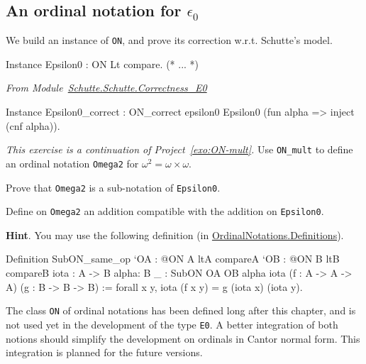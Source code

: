 \subsection{An ordinal notation for  \texorpdfstring{$\epsilon_0$}{epsilon0}}

We build an instance of \texttt{ON}, and prove its correction w.r.t. Schutte's model.

\label{instance-epsilon0}
\begin{Coqsrc}
Instance Epsilon0 : ON Lt compare.  
(* ... *)
\end{Coqsrc}


\emph{From Module~\href{../theories/html/hydras.Schutte.Schutte.Correctness_E0.html}{Schutte.Schutte.Correctness\_E0}}

\begin{Coqsrc}
Instance Epsilon0_correct :
  ON_correct epsilon0 Epsilon0 (fun alpha => inject (cnf alpha)).
\end{Coqsrc}

\begin{project}
 \emph{This exercise is a continuation of Project~\vref{exo:ON-mult}.}
Use \texttt{ON\_mult} to define an ordinal notation \texttt{Omega2} for $\omega^2=\omega\times\omega$.

Prove that \texttt{Omega2} is a sub-notation of \texttt{Epsilon0}.

Define on \texttt{Omega2} an addition compatible with the addition on \texttt{Epsilon0}.

\textbf{Hint}. You may use the following definition (in 
\href{../theories/html/hydras.OrdinalNotations.Definitions.html}{OrdinalNotations.Definitions}).

\begin{Coqsrc}
Definition SubON_same_op  `{OA : @ON A ltA  compareA}
       `{OB : @ON B ltB  compareB}
       {iota : A -> B} 
       {alpha: B}
       {_ : SubON OA OB alpha iota}
       (f : A -> A -> A)
       (g : B -> B -> B)
  :=
  forall x y,  iota (f x y) = g (iota x) (iota y).
\end{Coqsrc}

\end{project}

\begin{project}
The class \texttt{ON} of ordinal notations has been defined long after this 
chapter, and is not used yet in the development of the type \texttt{E0}. 
A better integration of both notions should simplify the development on ordinals in Cantor normal form. This integration is planned for the future versions.

\end{project}


